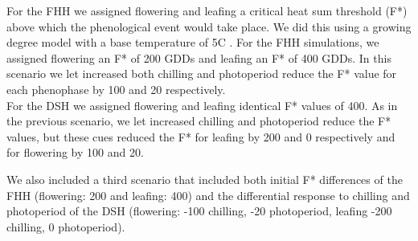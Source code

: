 \documentclass{article}\usepackage[]{graphicx}\usepackage[]{color}
\begin{document}
\noindent For the FHH we assigned flowering and leafing a critical heat sum threshold (F*) above which the phenological event would take place. We did this using a growing degree model with a base temperature of 5\degree C \citep{Fu:2014aa}. For the FHH simulations, we assigned flowering an F* of 200 GDDs and leafing an F* of 400 GDDs. In this scenario we let increased both chilling and photoperiod reduce the F* value for each phenophase by 100 and 20 respectively.\\

\noindent For the DSH we assigned flowering and leafing identical F* values of 400. As in the previous scenario, we let increased chilling and photoperiod reduce the F* values, but these cues reduced the F* for leafing by 200 and 0 respectively and for flowering by 100 and 20.

\noindent We also included a third scenario that included both initial F* differences of the FHH (flowering: 200 and leafing: 400) and the differential response to chilling and photoperiod of the DSH (flowering: -100 chilling, -20 photoperiod, leafing -200 chilling, 0 photoperiod).

 
\end{document}

